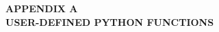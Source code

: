 \clearpage
\doublespacing
\vspace*{\fill} 
\begin{center}
\textbf{APPENDIX A}\label{appendixA}\\
\medskip
\textbf{USER-DEFINED PYTHON FUNCTIONS}\\
\end{center}
\vspace{7pt}
\vspace*{\fill}
\singlespacing